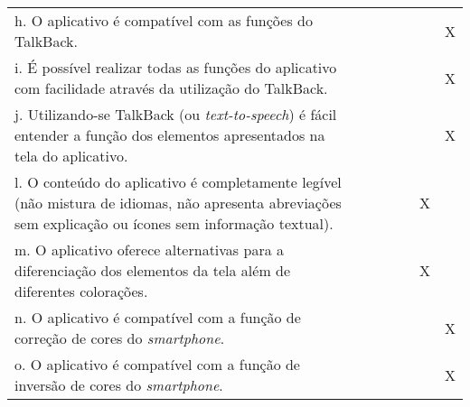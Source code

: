 \documentclass[portuguese,oneside]{tcc}
\begin{document}
\begin{center}
\begin{longtabu}{|L{25em}|c|c|c|c|c|c|}
																																	h. O aplicativo é compatível com as funções do TalkBack. & & & & & & X \\ 
																																	i. É possível realizar todas as funções do aplicativo com facilidade através da utilização do TalkBack.	& & & & & & X \\ 
																																	j. Utilizando-se TalkBack (ou \emph{text-to-speech}) é fácil entender a função dos elementos apresentados na tela do aplicativo. & & & & & & X \\ 
																																	l. O conteúdo do aplicativo é completamente legível (não mistura de idiomas, não apresenta abreviações sem explicação ou ícones sem informação textual). & & & & & X & \\ 
																																	m. O aplicativo oferece alternativas para a diferenciação dos elementos da tela além de diferentes colorações. & & & & & X & \\ 
																																	n. O aplicativo é compatível com a função de correção de cores do \emph{smartphone}. & & & & & & X \\ 
																																	o. O aplicativo é compatível com a função de inversão de cores do \emph{smartphone}. & & & & & & X \\ 
																																\end{longtabu}
																															\end{center}
																															
\end{document}
